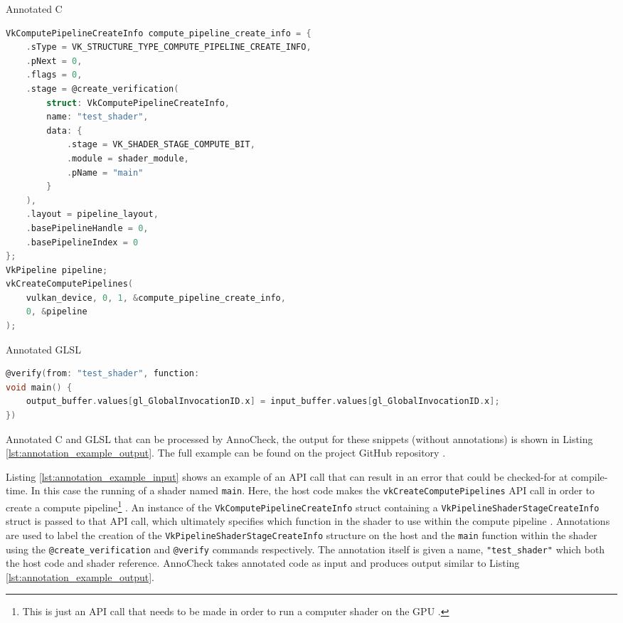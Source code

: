 \documentclass[a4paper,12pt,twoside,openright]{report}
\begin{document}
\begin{lstfloat}
\begin{center} Annotated C \end{center}
\begin{lstlisting}[language=C]
VkComputePipelineCreateInfo compute_pipeline_create_info = {
    .sType = VK_STRUCTURE_TYPE_COMPUTE_PIPELINE_CREATE_INFO,
    .pNext = 0,
    .flags = 0,
    .stage = @create_verification(
        struct: VkComputePipelineCreateInfo,
        name: "test_shader",
        data: {
            .stage = VK_SHADER_STAGE_COMPUTE_BIT,
            .module = shader_module,
            .pName = "main"
        }
    ),
    .layout = pipeline_layout,
    .basePipelineHandle = 0,
    .basePipelineIndex = 0
};
VkPipeline pipeline;
vkCreateComputePipelines(
    vulkan_device, 0, 1, &compute_pipeline_create_info,
    0, &pipeline
);
\end{lstlisting}
\begin{center} Annotated GLSL \end{center}
\begin{lstlisting}[language=C]
@verify(from: "test_shader", function:
void main() {
    output_buffer.values[gl_GlobalInvocationID.x] = input_buffer.values[gl_GlobalInvocationID.x];
})
\end{lstlisting}
\caption{Annotated C and GLSL that can be processed by AnnoCheck, the output
for these snippets (without annotations) is shown in Listing
\ref{lst:annotation_example_output}. The full example can be found on the
project GitHub repository \cite{ProjectSource}.}
\label{lst:annotation_example_input}
\end{lstfloat}

Listing \ref{lst:annotation_example_input} shows an example of an API call that
can result in an error that could be checked-for at compile-time. In this case
the running of a shader named \texttt{main}. Here, the host code makes the
\texttt{vkCreateComputePipelines} API call in order to create a compute
pipeline\footnote{This is just an API call that needs to be made in order to
run a computer shader on the GPU \cite{TODO}.} \cite{vkCreateComputePipelines}.
An instance of the \texttt{VkComputePipelineCreateInfo} struct containing a
\texttt{VkPipelineShaderStageCreateInfo} struct is passed to that API call,
which ultimately specifies which function in the shader to use within the
compute pipeline \cite{VkComputePipelineCreateInfo}
\cite{VkPipelineShaderStageCreateInfo}. Annotations are used to label the
creation of the \texttt{VkPipelineShaderStageCreateInfo} structure on the host
and the \texttt{main} function within the shader using the
\texttt{@create\_verification} and \texttt{@verify} commands respectively. The
annotation itself is given a name, \texttt{"test\_shader"} which both the host
code and shader reference. AnnoCheck takes annotated code as
input and produces output similar to Listing
\ref{lst:annotation_example_output}.
\end{document}
